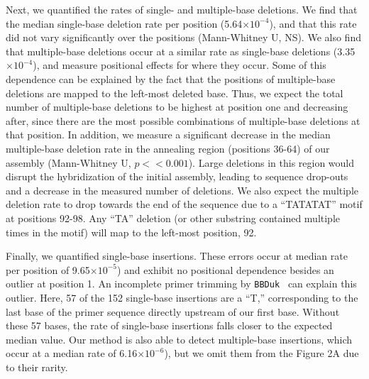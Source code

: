 \documentclass[letterpaper,12pt]{article}
\begin{document}
Next, we quantified the rates of single- and multiple-base deletions. We find that the median single-base deletion rate per position (5.64$\times 10^{-4}$), and that this rate did not vary significantly over the positions (Mann-Whitney U, NS). We also find that multiple-base deletions occur at a similar rate as single-base deletions (3.35$\times 10^{-4}$), and measure positional effects for where they occur. Some of this dependence can be explained by the fact that the positions of multiple-base deletions are mapped to the left-most deleted base. Thus, we expect the total number of multiple-base deletions to be highest at position one and decreasing after, since there are the most possible combinations of multiple-base deletions at that position. In addition, we measure a significant decrease in the median multiple-base deletion rate in the annealing region (positions 36-64) of our assembly (Mann-Whitney U, $p<<0.001$). Large deletions in this region would disrupt the hybridization of the initial assembly, leading to sequence drop-outs and a decrease in the measured number of deletions. We also expect the multiple deletion rate to drop towards the end of the sequence due to a “TATATAT” motif at positions 92-98. Any “TA” deletion (or other substring contained multiple times in the motif) will map to the left-most position, 92.

Finally, we quantified single-base insertions. These errors occur at median rate per position of 9.65$\times 10^{-5}$) and exhibit no positional dependence besides an outlier at position 1. An incomplete primer trimming by \texttt{BBDuk
} can explain this outlier. Here, 57 of the 152 single-base insertions are a “T,” corresponding to the last base of the primer sequence directly upstream of our first base. Without these 57 bases, the rate of single-base insertions falls closer to the expected median value. Our method is also able to detect multiple-base insertions, which occur at a median rate of 6.16$\times 10^{-6}$), but we omit them from the Figure 2A due to their rarity.


\clearpage
\end{document}

